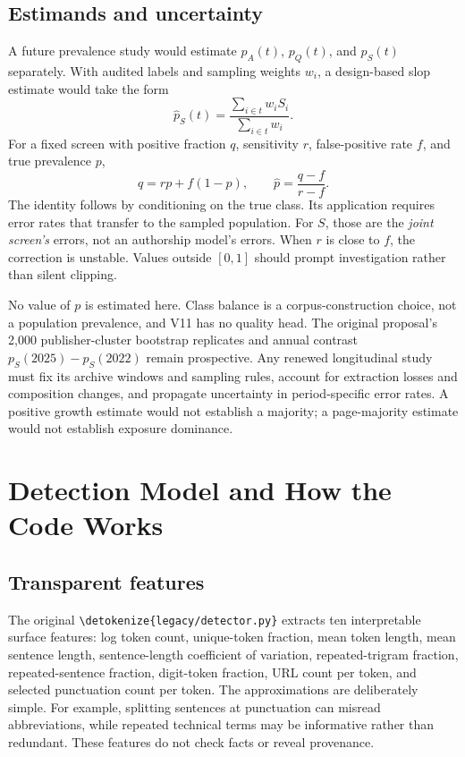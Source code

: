 \documentclass[11pt]{article}
\newcommand{\code}[1]{\expandafter\nolinkurl\expandafter{\detokenize{#1}}}
\begin{document}
\subsection{Estimands and uncertainty}
A future prevalence study would estimate $p_A(t)$, $p_Q(t)$, and $p_S(t)$
separately. With audited labels and sampling weights $w_i$, a design-based
slop estimate would take the form
\begin{equation}
\widehat p_S(t)=\frac{\sum_{i\in t}w_iS_i}{\sum_{i\in t}w_i}.
\end{equation}
For a fixed screen with positive fraction $q$, sensitivity $r$, false-positive
rate $f$, and true prevalence $p$,
\begin{equation}
q=rp+f(1-p),\qquad \widehat p=\frac{q-f}{r-f}.
\label{eq:correction}
\end{equation}
The identity follows by conditioning on the true class. Its application
requires error rates that transfer to the sampled population. For $S$, those
are the \emph{joint screen's} errors, not an authorship model's errors. When
$r$ is close to $f$, the correction is unstable. Values outside $[0,1]$ should
prompt investigation rather than silent clipping.

No value of $p$ is estimated here. Class balance is a corpus-construction
choice, not a population prevalence, and V11 has no quality head. The original
proposal's 2,000 publisher-cluster bootstrap replicates and annual contrast
$p_S(2025)-p_S(2022)$ remain prospective. Any renewed longitudinal study must
fix its archive windows and sampling rules, account for extraction losses
and composition changes, and propagate uncertainty in period-specific error
rates. A positive growth estimate would not establish a majority; a
page-majority estimate would not establish exposure dominance.

\section{Detection Model and How the Code Works}
\subsection{Transparent features}
The original \code{legacy/detector.py} extracts ten interpretable surface
features: log token count, unique-token fraction, mean token length, mean
sentence length, sentence-length coefficient of variation, repeated-trigram
fraction, repeated-sentence fraction, digit-token fraction, URL count per
token, and selected punctuation count per token. The approximations are
deliberately simple. For example, splitting sentences at punctuation can
misread abbreviations, while repeated technical terms may be informative
rather than redundant. These features do not check facts or reveal provenance.
\end{document}
